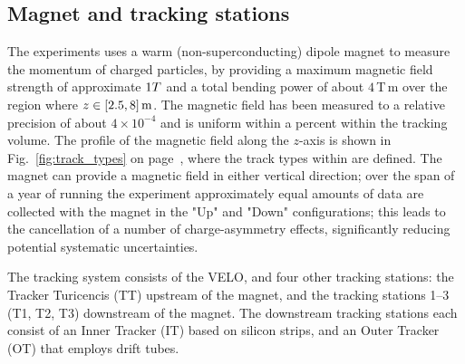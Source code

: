 \subsection{Magnet and tracking stations} %
\label{sub:magnet_and_tracking_stations}

The \lhcb experiments uses a warm (non-superconducting) dipole magnet to measure the momentum of charged particles, by providing a maximum magnetic field strength of approximate $1{T}$ and a total bending power of about $4\,$T\,m over the region where $z\in[2.5, 8]\text{\,m}$. The magnetic field has been measured to a relative precision of about $4\times 10^{-4}$ and is uniform within a percent within the tracking volume. The profile of the magnetic field along the $z$-axis is shown in Fig.~\ref{fig:track_types} on page~\pageref{fig:track_types}, where the track types within \lhcb are defined. The magnet can provide a magnetic field in either vertical direction; over the span of a year of running the experiment approximately equal amounts of data are collected with the magnet in the "Up" and "Down" configurations; this leads to the cancellation of a number of charge-asymmetry effects, significantly reducing potential systematic uncertainties. 

The tracking system consists of the VELO, and four other tracking stations: the Tracker Turicencis (TT) upstream of the magnet, and the tracking stations 1--3 (T1, T2, T3) downstream of the magnet. The downstream tracking stations each consist of an Inner Tracker (IT) based on silicon strips, and an Outer Tracker (OT) that employs drift tubes. 

